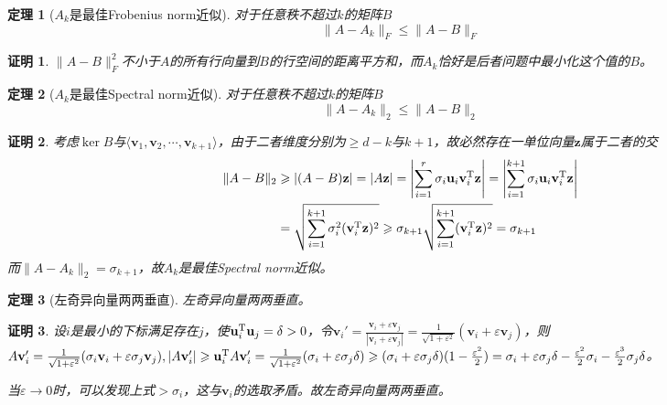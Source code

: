 \documentclass[8pt]{article}
\theoremstyle{compact}
\newtheorem{theorem}{定理}
\newtheorem{Proof}{证明}
\def\le{\leqslant}
\def\ge{\geqslant}
\begin{document}
\begin{theorem}[$A_k$是最佳Frobenius norm近似]
	对于任意秩不超过$k$的矩阵$B$
	\begin{equation}
	\|A - A_k\|_F \le \|A - B\|_F
	\end{equation}
\end{theorem}
\begin{Proof}
	$\|A - B\|_F^2$不小于$A$的所有行向量到$B$的行空间的距离平方和，而$A_k$恰好是后者问题中最小化这个值的$B$。
\end{Proof}
\begin{theorem}[$A_k$是最佳Spectral norm近似]
	对于任意秩不超过$k$的矩阵$B$
	\begin{equation}
	\|A - A_k\|_2 \le \|A - B\|_2
	\end{equation}
\end{theorem}
\begin{Proof}
	考虑$\ker B$与$\langle \mathbf v_1, \mathbf v_2, \cdots, \mathbf v_{k+1}\rangle$，由于二者维度分别为$\ge d - k$与$k + 1$，故必然存在一单位向量$\mathbf z$属于二者的交
	\begin{equation}
	\begin{split}
	\|A - B\|_2 &\ge |(A - B)\mathbf z| = |A\mathbf z| = \left|\sum_{i=1}^{r}\sigma_i\mathbf u_i\mathbf v_i^{\text T}\mathbf z\right| = \left|\sum_{i=1}^{k+1}\sigma_i\mathbf u_i\mathbf v_i^{\text T}\mathbf z\right| \\&= \sqrt{\sum_{i=1}^{k+1}\sigma_i^2(\mathbf v_i^{\text T}\mathbf z)^2} \ge \sigma_{k+1}\sqrt{\sum_{i=1}^{k+1}(\mathbf v_i^{\text T}\mathbf z)^2} = \sigma_{k+1}
\end{split}
	\end{equation}
	而$\|A - A_k\|_2 = \sigma_{k+1}$，故$A_k$是最佳Spectral norm近似。
\end{Proof}
\begin{theorem}[左奇异向量两两垂直]
	左奇异向量两两垂直。
\end{theorem}
\begin{Proof}
	设$i$是最小的下标满足存在$j$，使$\mathbf u_i^{\text T}\mathbf u_j = \delta > 0$，令$\mathbf v_i' = \frac{\mathbf v_i + \varepsilon \mathbf v_j}{|\mathbf v_i + \varepsilon \mathbf v_j|} = \frac{1}{\sqrt{1 + \varepsilon^2}}(\mathbf v_i + \varepsilon \mathbf v_j)$，则$A\mathbf v_i' = \frac{1}{\sqrt{1 + \varepsilon^2}}(\sigma_i\mathbf v_i + \varepsilon \sigma_j\mathbf v_j), |A\mathbf v_i'| \ge \mathbf u_i^{\text T}A\mathbf v_i' = \frac{1}{\sqrt{1+\varepsilon^2}}(\sigma_i + \varepsilon \sigma_j \delta) \ge (\sigma_i + \varepsilon \sigma_j \delta)(1 - \frac{\varepsilon^2}{2}) = \sigma_i + \varepsilon \sigma_j \delta - \frac{\varepsilon^2}{2}\sigma_i - \frac{\varepsilon^3}{2}\sigma_j\delta$。
	
	当$\varepsilon \to 0$时，可以发现上式$> \sigma_i$，这与$\mathbf v_i$的选取矛盾。故左奇异向量两两垂直。
\end{Proof}
\end{document}
